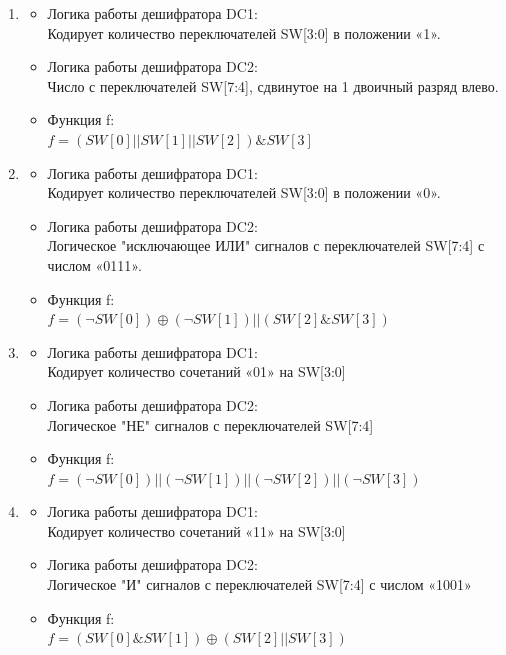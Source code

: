 \begin{enumerate}
    \item{
    \begin{itemize}
    \item Логика работы дешифратора DC1: \\
      Кодирует количество переключателей SW[3:0] в положении «1».
    \item Логика работы дешифратора DC2: \\ 
      Число с переключателей SW[7:4], сдвинутое на 1 двоичный разряд влево.
    \item Функция f:\\
      $f = (SW[0] || SW[1] || SW[2]) \& SW[3]$
    \end{itemize}
  }

    \item{
    \begin{itemize}
    \item Логика работы дешифратора DC1: \\
      Кодирует количество переключателей SW[3:0] в положении «0».
    \item Логика работы дешифратора DC2: \\ 
      Логическое "исключающее ИЛИ" сигналов с переключателей SW[7:4] с числом «0111».
    \item Функция f:\\
      $f = (\neg SW[0]) \oplus (\neg SW[1]) || (SW[2] \& SW[3])$
    \end{itemize}
  }

    \item{
    \begin{itemize}
    \item Логика работы дешифратора DC1: \\
      Кодирует количество сочетаний «01» на SW[3:0]
    \item Логика работы дешифратора DC2: \\ 
      Логическое "НЕ" сигналов с переключателей SW[7:4]
    \item Функция f:\\
      $f = (\neg SW[0]) || (\neg SW[1]) || (\neg SW[2]) || (\neg SW[3])$
    \end{itemize}
  }

    \item{
    \begin{itemize}
    \item Логика работы дешифратора DC1: \\
      Кодирует количество сочетаний «11» на SW[3:0]
    \item Логика работы дешифратора DC2: \\ 
      Логическое "И" сигналов с переключателей SW[7:4] с числом «1001»
    \item Функция f:\\
      $f = (SW[0] \& SW[1]) \oplus (SW[2] || SW[3])$
    \end{itemize}
  }


\end{enumerate}
